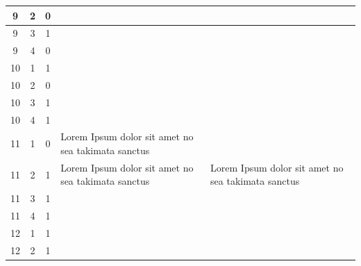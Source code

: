 \begin{landscape}
\begin{longtable}{|c|c|c|l|l|}
        9               & 2                      & 0               &                                                       &                                           \\ \hline
        9               & 3                      & 1               &                                                       &                                           \\ \hline
        9               & 4                      & 0               &                                                       &                                           \\ \hline
        10              & 1                      & 1               &                                                       &                                           \\ \hline
        10              & 2                      & 0              &                                                       &                                           \\ \hline
        10              & 3                      & 1               &                                                       &                                           \\ \hline
        10              & 4                      & 1               &                                                       &                                           \\ \hline
        11              & 1                      & 0               & Lorem Ipsum dolor sit amet no sea takimata sanctus   & \\ \hline
        11              & 2                      & 1               & Lorem Ipsum dolor sit amet no sea takimata sanctus                          & Lorem Ipsum dolor sit amet no sea takimata sanctus \\ \hline
        11              & 3                      & 1               &                                                       &                                           \\ \hline
        11              & 4                      & 1               &                                                       &                                           \\ \hline
        12              & 1                      & 1               &                                                       &                                           \\ \hline
        12              & 2                      & 1               &                                                       &                                           \\ \hline

\end{longtable}
\end{landscape}
